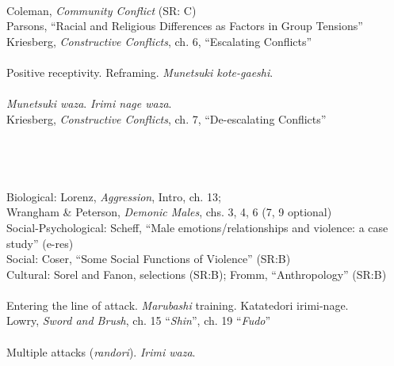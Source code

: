 \\
\indent Coleman, \emph{Community Conflict} (SR: C) \\
\indent Parsons, ``Racial and Religious Differences as Factors in Group Tensions'' \\
\indent Kriesberg, \emph{Constructive Conflicts}, ch. 6, ``Escalating Conflicts'' \\
 \\
\indent Positive receptivity. Reframing. \emph{Munetsuki kote-gaeshi}. \\
 \\
\indent \emph{Munetsuki waza}. \emph{Irimi nage waza}.  \\
\indent Kriesberg, \emph{Constructive Conflicts}, ch. 7, ``De-escalating Conflicts'' \\
 \\
 \\
 \\
 \\
\indent Biological: Lorenz, \emph{Aggression}, Intro, ch. 13;  \\
\indent Wrangham \& Peterson, \emph{Demonic Males}, chs. 3, 4, 6 (7, 9 optional) \\
\indent Social-Psychological: Scheff, ``Male emotions/relationships and violence: a case study'' (e-res) \\
\indent Social: Coser, ``Some Social Functions of Violence'' (SR:B) \\
\indent Cultural: Sorel and Fanon, selections (SR:B); Fromm, ``Anthropology'' (SR:B) \\
 \\
\indent Entering the line of attack. \emph{Marubashi} training. Katatedori irimi-nage. \\
\indent Lowry, \emph{Sword and Brush}, ch. 15 ``\emph{Shin}'', ch. 19 ``\emph{Fudo}'' \\
 \\
\indent Multiple attacks (\emph{randori}). \emph{Irimi waza}. \\
 \\
 \\
 \\
 \\
